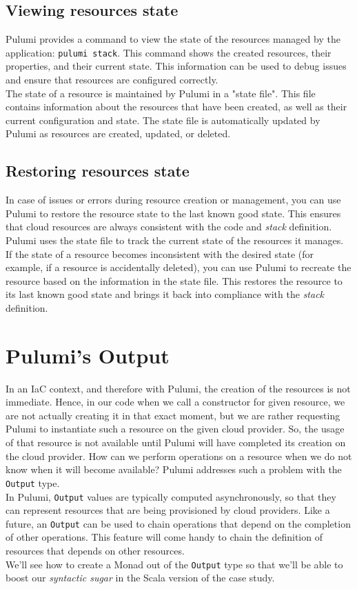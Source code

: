 \subsection{Viewing resources state}
Pulumi provides a command to view the state of the resources managed by the application: \texttt{pulumi stack}.
This command shows the created resources, their properties, and their current state. 
This information can be used to debug issues and ensure that resources are configured correctly.\\
The state of a resource is maintained by Pulumi in a "state file".
This file contains information about the resources that have been created, as well as their current configuration and state.
The state file is automatically updated by Pulumi as resources are created, updated, or deleted.

\subsection{Restoring resources state}
In case of issues or errors during resource creation or management, you can use Pulumi to restore the resource state to the last known good state.
This ensures that cloud resources are always consistent with the code and \textit{stack} definition.\\
Pulumi uses the state file to track the current state of the resources it manages.
If the state of a resource becomes inconsistent with the desired state (for example, if a resource is accidentally deleted), you can use Pulumi to recreate the resource based on the information in the state file.
This restores the resource to its last known good state and brings it back into compliance with the \textit{stack} definition.

\section{Pulumi's Output}
In an IaC context, and therefore with Pulumi, the creation of the resources is not immediate.
Hence, in our code when we call a constructor for given resource, we are not actually creating it in that exact moment, but we are rather requesting Pulumi to instantiate such a resource on the given cloud provider.
So, the usage of that resource is not available until Pulumi will have completed its creation on the cloud provider.
How can we perform operations on a resource when we do not know when it will become available?
Pulumi addresses such a problem with the \texttt{Output} type.\\
In Pulumi, \texttt{Output} values are typically computed asynchronously, so that they can represent resources that are being provisioned by cloud providers.
Like a future, an \texttt{Output} can be used to chain operations that depend on the completion of other operations.
This feature will come handy to chain the definition of resources that depends on other resources.\\
We'll see how to create a Monad out of the \texttt{Output} type so that we'll be able to boost our \textit{syntactic sugar} in the Scala version of the case study.
